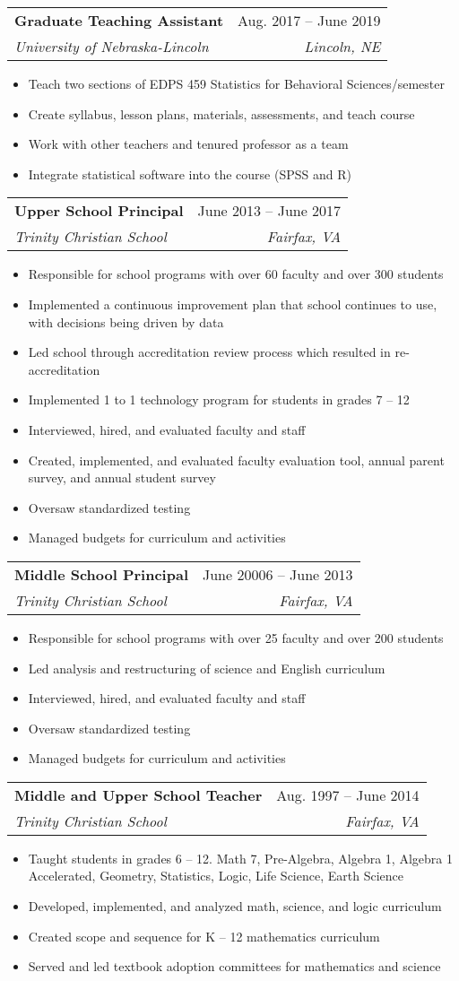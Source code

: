 \documentclass[letterpaper,11pt]{article}
\makeatletter
\newcommand{\resumeItem}[1]{
  \item\small{
    {#1 \vspace{-2pt}}
  }
}
\newcommand{\resumeSubheading}[4]{
  \vspace{-2pt}\item
    \begin{tabular*}{0.97\textwidth}[t]{l@{\extracolsep{\fill}}r}
      \textbf{#1} & #2 \\
      \textit{\small#3} & \textit{\small #4} \\
    \end{tabular*}\vspace{-7pt}
}
\newcommand{\resumeSubSubheading}[2]{
    \item
    \begin{tabular*}{0.97\textwidth}{l@{\extracolsep{\fill}}r}
      \textit{\small#1} & \textit{\small #2} \\
    \end{tabular*}\vspace{-7pt}
}
\newcommand{\resumeSubHeadingListEnd}{\end{itemize}}
\newcommand{\resumeItemListStart}{\begin{itemize}}
\newcommand{\resumeItemListEnd}{\end{itemize}\vspace{-5pt}}
\makeatother
\begin{document}

    \resumeSubheading
      {Graduate Teaching Assistant}{Aug. 2017 -- June 2019}
      {University of Nebraska-Lincoln}{Lincoln, NE}
      \resumeItemListStart
        \resumeItem{Teach two sections of EDPS 459 Statistics for Behavioral Sciences/semester}
        \resumeItem{Create syllabus, lesson plans, materials, assessments, and teach course}
        \resumeItem{Work with other teachers and tenured professor as a team}
        \resumeItem{Integrate statistical software into the course (SPSS and R)}
    \resumeItemListEnd

    \resumeSubheading
      {Upper School Principal}{June 2013 -- June 2017}
      {Trinity Christian School}{Fairfax, VA}
      \resumeItemListStart
        \resumeItem{Responsible for school programs with over 60 faculty and over 300 students}
        \resumeItem{Implemented a continuous improvement plan that school continues to use, with decisions being driven by data}
        \resumeItem{Led school through accreditation review process which resulted in re-accreditation}
        \resumeItem{Implemented 1 to 1 technology program for students in grades 7 – 12}
        \resumeItem{Interviewed, hired, and evaluated faculty and staff}
        \resumeItem{Created, implemented, and evaluated faculty evaluation tool, annual parent survey, and annual student survey}
        \resumeItem{Oversaw standardized testing}
        \resumeItem{Managed budgets for curriculum and activities}
      \resumeItemListEnd

    \resumeSubheading
      {Middle School Principal}{June 20006 -- June 2013}
      {Trinity Christian School}{Fairfax, VA}
        \resumeItemListStart
        \resumeItem{Responsible for school programs with over 25 faculty and over 200 students}
        \resumeItem{Led analysis and restructuring of science and English curriculum}
        \resumeItem{Interviewed, hired, and evaluated faculty and staff}
        \resumeItem{Oversaw standardized testing}
        \resumeItem{Managed budgets for curriculum and activities}
    \resumeSubHeadingListEnd

  \resumeSubheading
      {Middle and Upper School Teacher}{Aug. 1997 -- June 2014}
      {Trinity Christian School}{Fairfax, VA}
      \resumeItemListStart
      \resumeItem{Taught students in grades 6 – 12. Math 7, Pre-Algebra, Algebra 1, Algebra 1 Accelerated, Geometry, Statistics, Logic, Life Science, Earth Science}
      \resumeItem{Developed, implemented, and analyzed math, science, and logic curriculum}
      \resumeItem{Created scope and sequence for K – 12 mathematics curriculum}
      \resumeItem{Served and led textbook adoption committees for mathematics and science}
    \resumeSubHeadingListEnd
\end{document}
